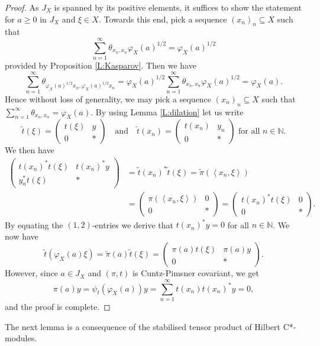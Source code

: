 \documentclass[11pt, draft]{amsart}
\numberwithin{equation}{section}
\theoremstyle{plain}
\theoremstyle{definition}
\theoremstyle{remark}
\newcommand\vphi{\varphi}
\newcommand{\bN}{\mathbb{N}}
\newcommand{\foral}{\text{ for all }}
\newcommand{\qand}{\quad\text{and}\quad}
\newcommand{\wt}{\widetilde}
\newcommand{\sca}[1]{\left\langle#1\right\rangle} %
\begin{document}
\begin{proof}
As $J_X$ is spanned by its positive elements, it suffices to show the statement for $a \geq 0$ in $J_X$ and $\xi \in X$.
Towards this end, pick a sequence $(x_n)_n \subseteq X$ such that 
\[
\sum_{n=1}^\infty \theta_{x_n, x_n} \vphi_X(a)^{1/2} = \vphi_X(a)^{1/2}
\]
provided by Proposition \ref{L:Kasparov}. 
Then we have
\[
\sum_{n=1}^\infty \theta_{\vphi_X(a)^{1/2}x_n, \vphi_X(a)^{1/2}x_n} = \vphi_X(a)^{1/2} \sum_{n=1}^\infty \theta_{x_n, x_n} \vphi_X(a)^{1/2} = \vphi_X(a).
\]
Hence without loss of generality, we may pick a sequence $(x_n)_n \subseteq X$ such that $\sum_{n=1}^\infty \theta_{x_n, x_n} = \vphi_X(a)$.
By using Lemma \ref{L:dilation} let us write
\[
\wt{t}(\xi) = \begin{pmatrix} t(\xi) & y \\ 0 & \ast \end{pmatrix}
\qand
\wt{t}(x_n) = \begin{pmatrix} t(x_n) & y_n \\ 0 & \ast \end{pmatrix} \foral n \in \bN.
\]
We then have 
\begin{align*}
\begin{pmatrix} t(x_n)^* t(\xi) & t(x_n)^* y \\ y_n^* t(\xi) & \ast 
\end{pmatrix} 
&= 
\wt{t}(x_n)^* \wt{t}(\xi) 
= 
\wt{\pi}(\sca{x_n,\xi})\\
&= \begin{pmatrix} 
\pi(\sca{x_n,\xi}) & 0 \\ 0 & \ast \end{pmatrix} 
=
\begin{pmatrix}
t(x_n)^* t(\xi) & 0 \\ 0 & \ast \end{pmatrix}.
\end{align*}
By equating the $(1,2)$-entries we derive that $t(x_n)^* y = 0$ for all $n \in \bN$.
We now have
\[
\wt{t}(\vphi_X(a) \xi) = \wt{\pi}(a) \wt{t}(\xi) = \begin{pmatrix} \pi(a) t(\xi) & \pi(a) y \\ 0 & \ast \end{pmatrix}.
\]
However, since $a \in J_X$ and $(\pi,t)$ is Cuntz-Pimsner covariant, we get
\[
\pi(a) y = \psi_{t}(\vphi_X(a)) y = \sum_{n=1}^\infty t(x_n) t(x_n)^* y = 0, 
\]
and the proof is complete.
\end{proof}

The next lemma is a consequence of the stabilised tensor product of Hilbert C*-modules.
\end{document}
